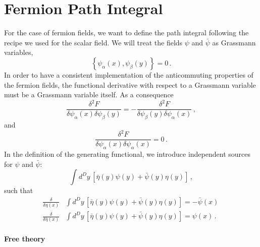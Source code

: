 \renewcommand{\tphi}{\tilde{\phi}}
\renewcommand{\tj}{\tilde{J}}
\renewcommand{\tchi}{\tilde{\chi}}
\renewcommand{\psibar}{\bar{\psi}}
\renewcommand{\etabar}{\bar{\eta}}

\section{Fermion Path Integral}
\label{sec:ferm-path-integr}

For the case of fermion fields, we want to define the path integral
following the recipe we used for the scalar field. We will treat the
fields $\psi$ and $\bar\psi$ as Grassmann variables, \ie 
\begin{equation}
  \label{eq:GrassVar}
  \left\{\psi_\alpha(x),\psi_\beta(y)\right\}=0\, .
\end{equation}
In order to have a consistent implementation of the anticommuting
properties of the fermion fields, the functional derivative with
respect to a Grassmann variable must be a Grassmann variable
itself. As a consequence
\begin{equation}
  \label{eq:GrassDer}
  \frac{\delta^2 F}{\delta \psi_\alpha(x) \delta\psi_\beta(y)} = 
  -\frac{\delta^2 F}{\delta \psi _\beta(y) \delta\psi_\alpha(x)}\, ,
\end{equation}
and 
\begin{equation}
  \label{eq:GrassDer2}
    \frac{\delta^2 F}{\delta \psi_\alpha(x) \delta\psi_\alpha(x)} = 0\,.
\end{equation}
In the definition of the generating functional, we introduce
independent sources for $\psi$ and $\bar{\psi}$:
\begin{equation}
  \label{eq:SourceTerm}
  \int d^Dy\, \left[
    \bar{\eta}(y) \psi(y) + \bar{\psi}(y) \eta(y)
    \right]\, ,
\end{equation}
such that
\begin{align}
  \label{eq:GrassDerivOne}
  \frac{\delta}{\delta\eta(x)} &\int d^Dy\, \left[
    \bar{\eta}(y) \psi(y) + \bar{\psi}(y) \eta(y)
    \right] = - \psibar(x)\, \\
  \label{eq:GrassDerivOne}
  \frac{\delta}{\delta\etabar(x)} &\int d^Dy\, \left[
    \bar{\eta}(y) \psi(y) + \bar{\psi}(y) \eta(y)
    \right] = \psi(x)\, .
\end{align}

\paragraph{Free theory}

